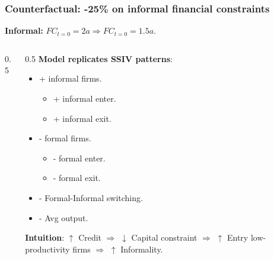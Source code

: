 \documentclass[aspectratio=169]{beamer}
\begin{document}
\begin{frame}
\frametitle{\textbf{Counterfactual}: -25\% on informal financial constraints}

\begin{center}
    \textbf{Informal:} $FC_{t=0} = 2a \Rightarrow FC_{t=0} = 1.5a$.    
\end{center}

\begin{columns}[T] 
    \begin{column}{0.5\textwidth} 
        \begin{center}
            \small
            \vspace{-6mm}
            
        \end{center}
    \end{column}

    \begin{column}{0.5\textwidth} 
        \textbf{Model replicates SSIV patterns}:
        \begin{itemize}
            \item + informal firms.
            \begin{itemize}
                \item + informal enter.
                \item + informal exit.
            \end{itemize}
            \item - formal firms.
            \begin{itemize}
                \item - formal enter.
                \item - formal exit.
            \end{itemize}
            \item - Formal-Informal switching.
            \item - Avg output.
        \end{itemize}
        \begin{center}
            \textbf{Intuition}: $\uparrow$ Credit $\Rightarrow$ $\downarrow$ Capital constraint $\Rightarrow$ $\uparrow$ Entry low-productivity firms $\Rightarrow$ $\uparrow$ Informality.
        \end{center}
    \end{column}
\end{columns}


\end{frame}

\end{document}
